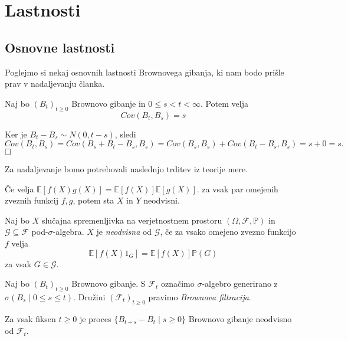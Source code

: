\documentclass[twoside,11pt]{article}
\begin{document}
\section{Lastnosti}

\subsection{Osnovne lastnosti}

Poglejmo si nekaj osnovnih lastnosti Brownovega gibanja, ki nam bodo prišle prav v nadaljevanju 
članka.

\begin{trditev}
    Naj bo $(B_t)_{t\geq 0}$ Brownovo gibanje in $0 \leq s < t < \infty$. Potem velja
    $$
        Cov(B_t, B_s) = s
    $$
\end{trditev}

\begin{dokaz}
    Ker je $B_t - B_s \sim N(0, t-s)$, sledi
    $$
        Cov(B_t, B_s) = Cov(B_s + B_t - B_s, B_s) = Cov(B_s, B_s) + Cov(B_t - B_s, B_s) = s + 0 = s.
    $$
    $\hfill \square$
\end{dokaz}

Za nadaljevanje bomo potrebovali naslednjo trditev iz teorije mere.

\begin{trditev}
     Če velja $\mathbb{E}\left[f(X)g(X)\right] = \mathbb{E}\left[f(X)\right]\mathbb{E}\left[g(X)\right]$. za vsak par 
     omejenih zveznih funkcij $f, g$, potem sta $X$ in $Y$ neodvisni.
\end{trditev}

\begin{definicija}
    Naj bo $X$ slučajna spremenljivka na verjetnostnem prostoru $(\Omega, \mathcal{F}, \mathbb{P})$
    in $\mathcal{G} \subseteq \mathcal{F}$ pod-$\sigma$-algebra. $X$ je \textit{neodvisna}
    od $\mathcal{G}$, če za vsako omejeno zvezno funkcijo $f$ velja
    $$
        \mathbb{E}\left[f(X)1_G\right] = \mathbb{E}\left[f(X)\right]\mathbb{P}(G)
    $$
    za vsak $G \in \mathcal{G}$.
\end{definicija}

\begin{definicija}
    Naj bo $(B_t)_{t\geq 0}$ Brownovo gibanje. S $\mathcal{F}_t$ 
    označimo $\sigma$-algebro generirano z$ \sigma(B_s \mid 0\leq s \leq t)$. 
    Družini $(\mathcal{F}_t)_{t\geq 0}$ pravimo \textit{Brownova filtracija}.
\end{definicija}

\begin{izrek}
    Za vsak fiksen $t \geq 0$ je proces $\{B_{t+s}-B_t\mid s\geq 0\}$ Brownovo gibanje neodvisno 
    od $\mathcal{F}_t$.
\end{izrek}
\end{document}
